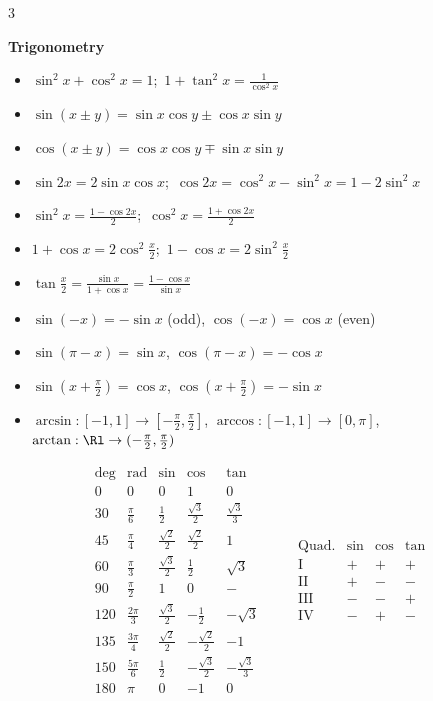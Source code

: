 \vspace{1pt}
\begin{multicols}{3}
{\fontsize{6.2pt}{7.3pt}\selectfont

\textbf{\sffamily\color{subText}Trigonometry}
\begin{itemize}[noitemsep,topsep=0pt,leftmargin=*]
\item $\sin^2x+\cos^2x=1$;\ $1+\tan^2x=\frac1{\cos^2x}$
\item $\sin(x\pm y)=\sin x\cos y\pm\cos x\sin y$
\item $\cos(x\pm y)=\cos x\cos y\mp\sin x\sin y$
\item $\sin2x=2\sin x\cos x$;\ $\cos2x=\cos^2x-\sin^2x=1-2\sin^2x$
\item $\sin^2x=\frac{1-\cos2x}2$;\ $\cos^2x=\frac{1+\cos2x}2$
\item $1+\cos x=2\cos^2\frac x2$;\ $1-\cos x=2\sin^2\frac x2$
\item $\tan\frac x2=\frac{\sin x}{1+\cos x}=\frac{1-\cos x}{\sin x}$
\item $\sin(-x)=-\sin x$ (odd), $\cos(-x)=\cos x$ (even)
\item $\sin(\pi-x)=\sin x$, $\cos(\pi-x)=-\cos x$
\item $\sin(x+\frac\pi2)=\cos x$, $\cos(x+\frac\pi2)=-\sin x$
\item $\arcsin:[-1,1]\to[-\frac\pi2,\frac\pi2]$, $\arccos:[-1,1]\to[0,\pi]$, $\arctan:\Rl\to(-\frac\pi2,\frac\pi2)$
\end{itemize}

\vspace{1pt}
\[
\begin{array}{c|c|c|c|c}
\deg & \mathrm{rad} & \sin & \cos & \tan\\
\hline
0 & 0 & 0 & 1 & 0\\
30 & \frac\pi6 & \frac12 & \frac{\sqrt3}2 & \frac{\sqrt3}3\\
45 & \frac\pi4 & \frac{\sqrt2}2 & \frac{\sqrt2}2 & 1\\
60 & \frac\pi3 & \frac{\sqrt3}2 & \frac12 & \sqrt3\\
90 & \frac\pi2 & 1 & 0 & -\\
120 & \frac{2\pi}3 & \frac{\sqrt3}2 & -\frac12 & -\sqrt3\\
135 & \frac{3\pi}4 & \frac{\sqrt2}2 & -\frac{\sqrt2}2 & -1\\
150 & \frac{5\pi}6 & \frac12 & -\frac{\sqrt3}2 & -\frac{\sqrt3}3\\
180 & \pi & 0 & -1 & 0
\end{array}
\qquad
\begin{array}{c|c|c|c}
\text{Quad.} & \sin & \cos & \tan\\
\hline
\text{I} & + & + & +\\
\text{II} & + & - & -\\
\text{III} & - & - & +\\
\text{IV} & - & + & -
\end{array}
\]

}
\end{multicols}
